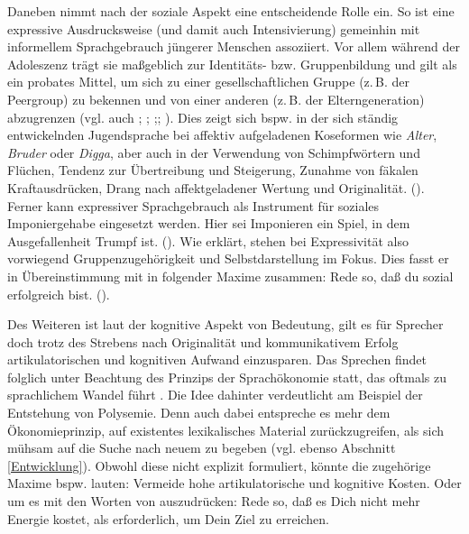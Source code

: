 Daneben nimmt nach \citet[190]{Kirschbaum.2002b} der soziale Aspekt eine entscheidende Rolle ein. So ist eine expressive Ausdrucksweise (und damit auch Intensivierung) gemeinhin mit informellem Sprachgebrauch jüngerer Menschen assoziiert. Vor allem während der Adoleszenz trägt sie maßgeblich zur Identitäts- bzw. Gruppenbildung und gilt als ein probates Mittel, um sich zu einer gesellschaftlichen Gruppe (z.\,B. der Peergroup) zu bekennen und von einer anderen (z.\,B. der Elterngeneration) abzugrenzen (vgl. auch \citealt[6]{Martinet.1991}; \citealt[143]{Lorenz.2002}; \citealt[362f.]{Tagliamonte.2008};; \citealt[181]{Schmidlin.2015}). Dies zeigt sich bspw. in der sich ständig entwickelnden Jugendsprache bei affektiv aufgeladenen Koseformen wie \textit{Alter}, \textit{Bruder} oder \textit{Digga}, aber auch in der \glqq{}Verwendung von Schimpfwörtern und Flüchen, Tendenz zur Übertreibung und Steigerung, Zunahme von fäkalen Kraftausdrücken, Drang nach affektgeladener Wertung und Originalität.\grqq{} (\citealt[90]{Klara.2009}). Ferner kann expressiver Sprachgebrauch als Instrument für soziales Imponiergehabe eingesetzt werden. Hier sei \glqq{}Imponieren \textelp{} ein Spiel, in dem Ausgefallenheit Trumpf ist.\grqq{} ({\citealt[3]{Keller.2003}}). Wie {\citet[190f.]{Kirschbaum.2002b}} erklärt, stehen bei Expressivität also vorwiegend Gruppenzugehörigkeit und Selbstdarstellung im Fokus. Dies fasst er in Übereinstimmung mit \citet[138]{Keller.1990} in folgender Maxime zusammen: \glqq{}Rede so, daß du sozial erfolgreich bist.\grqq{} ({\citealt[191]{Kirschbaum.2002b}}).


Des Weiteren ist laut \citet[189]{Kirschbaum.2002b} der kognitive Aspekt von Bedeutung, gilt es für Sprecher doch trotz des Strebens nach Originalität und kommunikativem Erfolg artikulatorischen und kognitiven Aufwand einzusparen. Das Sprechen findet folglich unter Beachtung des Prinzips der Sprachökonomie statt, das oftmals zu sprachlichem Wandel führt {\citep[vgl.][627]{Bussmann.2002}}. Die Idee dahinter verdeutlicht {\citet[188]{Kirschbaum.2002b}} am Beispiel der Entstehung von Polysemie. Denn auch dabei entspreche es mehr dem Ökonomieprinzip, auf existentes lexikalisches Material zurückzugreifen, als sich mühsam auf die Suche nach neuem zu begeben (vgl. ebenso Abschnitt \ref{Entwicklung}). Obwohl {\citet[]{Kirschbaum.2002b}} diese nicht explizit formuliert, könnte die zugehörige Maxime bspw. lauten: Vermeide hohe artikulatorische und kognitive Kosten. Oder um es mit den Worten von \citet[142]{Keller.1994} auszudrücken: \glqq{}Rede so, daß es Dich nicht mehr Energie kostet, als erforderlich, um Dein Ziel zu erreichen.\grqq{}

